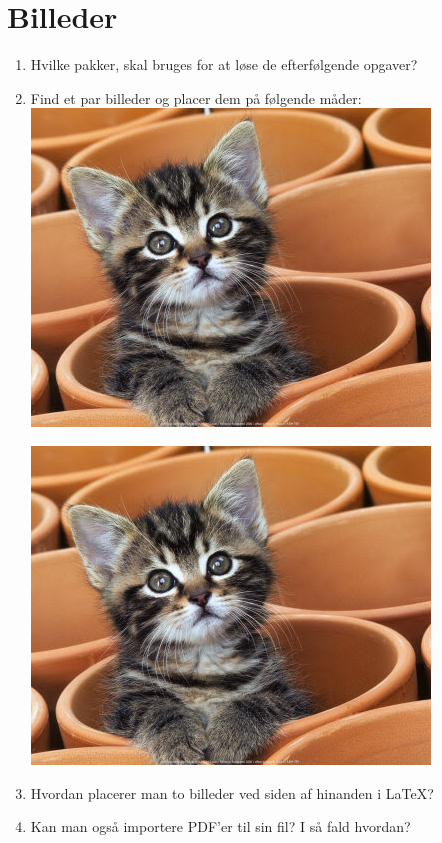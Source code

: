 \documentclass[12pt]{article}
\begin{document}
\section{Billeder}
	\begin{enumerate}
  		\item Hvilke pakker, skal bruges for at løse de efterfølgende opgaver?
		\item Find et par billeder og placer dem på følgende måder:\\
	
		\includegraphics[scale=0.5]{cat}
	
		\includegraphics[scale=0.5, angle=180]{cat}
		
		\item Hvordan placerer man to billeder ved siden af hinanden i \LaTeX{}?
		\item Kan man også importere PDF'er til sin fil? I så fald hvordan?
	\end{enumerate}
\end{document}
